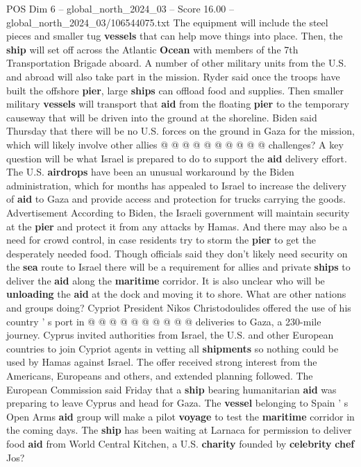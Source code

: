 \begin{textsample}{POS Dim 6 – global\_north\_2024\_03 – Score 16.00 – global\_north\_2024\_03/106544075.txt}
The equipment will include the steel pieces and smaller tug \textbf{vessels} that can help move things into place.
Then, the \textbf{ship} will set off across the Atlantic \textbf{Ocean} with members of the 7th Transportation Brigade aboard.
A number of other military units from the U.S. and abroad will also take part in the mission.
Ryder said once the troops have built the offshore \textbf{pier}, large \textbf{ships} can offload food and supplies.
Then smaller military \textbf{vessels} will transport that \textbf{aid} from the floating \textbf{pier} to the temporary causeway that will be driven into the ground at the shoreline.
Biden said Thursday that there will be no U.S. forces on the ground in Gaza for the mission, which will likely involve other allies @ @ @ @ @ @ @ @ @ @ challenges?
A key question will be what Israel is prepared to do to support the \textbf{aid} delivery effort.
The U.S. \textbf{airdrops} have been an unusual workaround by the Biden administration, which for months has appealed to Israel to increase the delivery of \textbf{aid} to Gaza and provide access and protection for trucks carrying the goods.
Advertisement According to Biden, the Israeli government will maintain security at the \textbf{pier} and protect it from any attacks by Hamas.
And there may also be a need for crowd control, in case residents try to storm the \textbf{pier} to get the desperately needed food.
Though officials said they don't likely need security on the \textbf{sea} route to Israel there will be a requirement for allies and private \textbf{ships} to deliver the \textbf{aid} along the \textbf{maritime} corridor.
It is also unclear who will be \textbf{unloading} the \textbf{aid} at the dock and moving it to shore.
What are other nations and groups doing?
Cypriot President Nikos Christodoulides offered the use of his country ' s port in @ @ @ @ @ @ @ @ @ @ deliveries to Gaza, a 230-mile journey.
Cyprus invited authorities from Israel, the U.S. and other European countries to join Cypriot agents in vetting all \textbf{shipments} so nothing could be used by Hamas against Israel.
The offer received strong interest from the Americans, Europeans and others, and extended planning followed.
The European Commission said Friday that a \textbf{ship} bearing humanitarian \textbf{aid} was preparing to leave Cyprus and head for Gaza.
The \textbf{vessel} belonging to Spain ' s Open Arms \textbf{aid} group will make a pilot \textbf{voyage} to test the \textbf{maritime} corridor in the coming days.
The \textbf{ship} has been waiting at Larnaca for permission to deliver food \textbf{aid} from World Central Kitchen, a U.S. \textbf{charity} founded by \textbf{celebrity} \textbf{chef} Jos?

\end{textsample}
